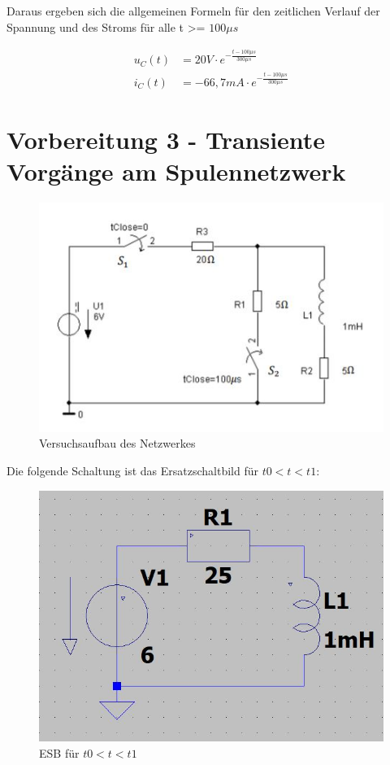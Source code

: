 \documentclass{article}
\begin{document}
Daraus ergeben sich die allgemeinen Formeln für den zeitlichen Verlauf der Spannung und des Stroms für alle t >= $100\mu s$

\begin{align*}
  u_C(t)&= 20V \cdot e^{-\frac{t-100\mu s}{300\mu s}}\\
  i_C(t)&= -66,7mA \cdot e^{-\frac{t-100\mu s}{300\mu s}}
\end{align*}

\newpage

\section{Vorbereitung 3 - Transiente Vorgänge am Spulennetzwerk}

\begin{figure}[h]
  \begin{center}
    \includegraphics[scale=1]{../assets/images/ET2P5/vorbereitung 3.jpg}
    \caption{Versuchsaufbau des Netzwerkes}
  \end{center}
\end{figure}

Die folgende Schaltung ist das Ersatzschaltbild für $t0 < t < t1$:
\begin{figure}[h]
  \begin{center}
    \includegraphics[scale=0.3]{../assets/images/ET2P5/t0 t t1.JPG}
    \caption{ESB für $t0 < t < t1$ }
  \end{center}
\end{figure}
\end{document}
